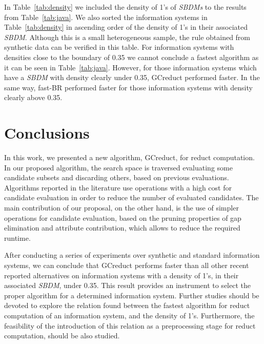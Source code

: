 \documentclass[authoryear,preprint,review,12pt]{elsarticle}
\begin{document}
	In Table~\ref{tab:density} we included the density of 1's of \textit{SBDMs} to the results from Table~\ref{tab:java}. We also sorted the information systems in Table~\ref{tab:density} in ascending order of the density of 1's in their associated \textit{SBDM}. Although this is a small heterogeneous sample, the rule obtained from synthetic data can be verified in this table. For information systems with densities close to the boundary of 0.35 we cannot conclude a fastest algorithm as it can be seen in Table~\ref{tab:java}. However, for those information systems which have a \textit{SBDM} with density clearly under 0.35, GCreduct performed faster. In the same way, fast-BR performed faster for those information systems with density clearly above 0.35.

\section{Conclusions}\label{conclusions}
	In this work, we presented a new algorithm, GCreduct, for reduct computation. In our proposed algorithm, the search space is traversed evaluating some candidate subsets and discarding others, based on previous evaluations. Algorithms reported in the literature use operations with a high cost for candidate evaluation in order to reduce the number of evaluated candidates. The main contribution of our proposal, on the other hand, is the use of simpler operations for candidate evaluation, based on the pruning properties of gap elimination and attribute contribution, which allows to reduce the required runtime. 
	
	After conducting a series of experiments over synthetic and standard information systems, we can conclude that GCreduct performs faster than all other recent reported alternatives on information systems with a density of 1's, in their associated \textit{SBDM}, under 0.35. This result provides an instrument to select the proper algorithm for a determined information system. Further studies should be devoted to explore the relation found between the fastest algorithm for reduct computation of an information system, and the density of 1's. Furthermore, the feasibility of the introduction of this relation as a preprocessing stage for reduct computation, should be also studied.
	
\newpage 
{}

\end{document}
